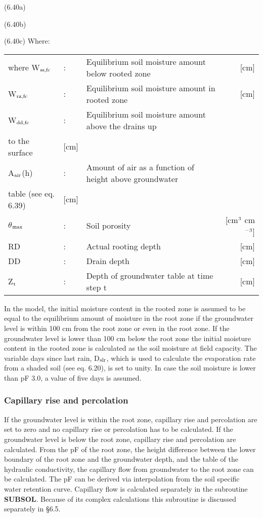  
\strut\hfill (6.40a)\\
\strut\hfill (6.40b)\\
\strut\hfill (6.40c)
Where:\\
\begin{tabularx}{\textwidth}{llXr}

where W$_{{\rm ss,fc}}$ &:& Equilibrium soil moisture amount below rooted zone  & [cm]\\
W$_{{\rm rz,fc}}$ &:& Equilibrium soil moisture amount in rooted zone  & [cm]\\
W$_{{\rm dd,fc}}$ &:& Equilibrium soil moisture amount above the drains up \\
   to the surface  & [cm]\\
A$_{{\rm air}}$(h) &:& Amount of air as a function of height above groundwater\\
   table (see eq. 6.39)  & [cm]\\
$\theta$$_{{\rm max}}$ &:& Soil porosity  & [cm$^{{\rm 3}}$ cm$^{{\rm -3}}$]\\
RD &:& Actual rooting depth  & [cm]\\
DD &:& Drain depth  & [cm]\\
Z$_{{\rm t}}$ &:& Depth of groundwater table at time step t  & [cm]
\end{tabularx}

In the model, the initial moisture content in the rooted zone is assumed to be equal to the
equilibrium amount of moisture in the root zone if the groundwater level is within 100 cm
from the root zone or even in the root zone. If the groundwater level is lower than 100
cm below the root zone the initial moisture content in the rooted zone is calculated as the
soil moisture at field capacity. The variable days since last rain, D$_{{\rm slr}}$, which is used to
calculate the evaporation rate from a shaded soil (see eq. 6.20), is set to unity. In case the
soil moisture is lower than pF 3.0, a value of five days is assumed.

\subsubsection{Capillary rise and percolation}
If the groundwater level is within the root zone, capillary rise and percolation are set to
zero and no capillary rise or percolation has to be calculated. 
If the groundwater level is below the root zone, capillary rise and percolation are
calculated. From the pF of the root zone, the height difference between the lower
boundary of the root zone and the groundwater depth, and the table of the hydraulic
conductivity, the capillary flow from groundwater to the root zone can be calculated. The
pF can be derived via interpolation from the soil specific water retention curve. Capillary
flow is calculated separately in the subroutine {\bf SUBSOL}. Because of its complex 
calculations this subroutine is discussed separately in \S 6.5. 

